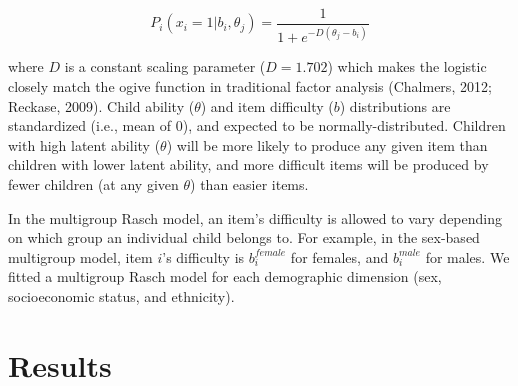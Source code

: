 \documentclass[10pt, letterpaper]{article}
\begin{document}
\[P_{i}(x_i = 1 | b_{i},\theta_j ) = \frac{1}{1 + e^{-D(\theta_j - b_i )}}\]

where \(D\) is a constant scaling parameter (\(D=1.702\)) which makes
the logistic closely match the ogive function in traditional factor
analysis (Chalmers, 2012; Reckase, 2009). Child ability (\(\theta\)) and
item difficulty (\(b\)) distributions are standardized (i.e., mean of
0), and expected to be normally-distributed. Children with high latent
ability (\(\theta\)) will be more likely to produce any given item than
children with lower latent ability, and more difficult items will be
produced by fewer children (at any given \(\theta\)) than easier items.

In the multigroup Rasch model, an item's difficulty is allowed to vary
depending on which group an individual child belongs to. For example, in
the sex-based multigroup model, item \(i\)'s difficulty is
\(b_{i}^{female}\) for females, and \(b_{i}^{male}\) for males. We
fitted a multigroup Rasch model for each demographic dimension (sex,
socioeconomic status, and ethnicity).

\hypertarget{results}{%
\section{Results}\label{results}}
\end{document}
